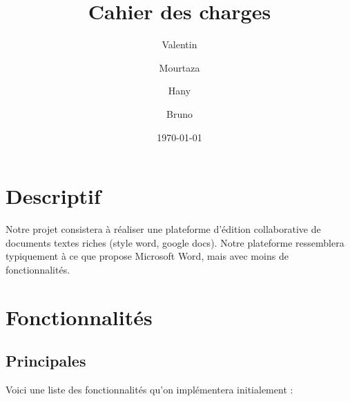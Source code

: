 

\author{Valentin }
\author{Mourtaza }
\author{Hany }
\author{Bruno }
\date{\today}
\title{Cahier des charges}


\maketitle

\newpage
\tableofcontents

\newpage

\section{Descriptif}

	Notre projet consistera à réaliser une plateforme d'édition collaborative de documents textes riches (style word, google docs). Notre plateforme ressemblera typiquement à ce que propose Microsoft Word, mais avec moins de fonctionnalités.

\section{Fonctionnalités}

	\subsection{Principales}
	Voici une liste des fonctionnalités qu'on implémentera initialement : \par
	
